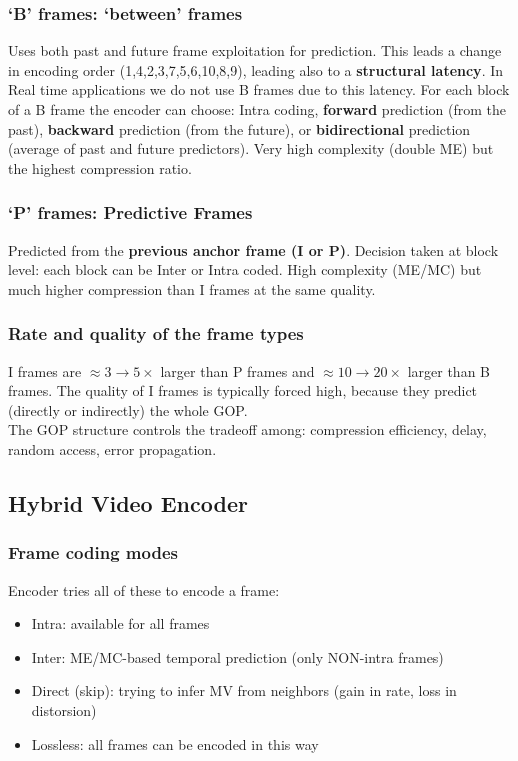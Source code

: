 \subsubsection{`B' frames: `between' frames}
Uses both past and future frame exploitation for prediction. This leads a change in encoding order (1,4,2,3,7,5,6,10,8,9), leading also to a \textbf{structural latency}.
In Real time applications we do not use B frames due to this latency.
For each block of a B frame the encoder can choose: Intra coding, \textbf{forward} prediction (from the past), \textbf{backward} prediction (from the future), or \textbf{bidirectional} prediction (average of past and future predictors). Very high complexity (double ME) but the highest compression ratio.
\subsubsection{`P' frames: Predictive Frames}
Predicted from the \textbf{previous anchor frame (I or P)}. Decision taken at block level: each block can be Inter or Intra coded. High complexity (ME/MC) but much higher compression than I frames at the same quality.
\subsubsection{Rate and quality of the frame types}
I frames are $\approx 3\to5\times$ larger than P frames and $\approx 10\to20\times$ larger than B frames. The quality of I frames is typically forced high, because they predict (directly or indirectly) the whole GOP.\\
The GOP structure controls the tradeoff among: compression efficiency, delay, random access, error propagation.
\subsection{Hybrid Video Encoder}
\subsubsection{Frame coding modes}
Encoder tries all of these to encode a frame:
\begin{itemize}
    \item Intra: available for all frames
    \item Inter: ME/MC-based temporal prediction (only NON-intra frames)
    \item Direct (skip): trying to infer MV from neighbors (gain in rate, loss in distorsion)
    \item Lossless: all frames can be encoded in this way
\end{itemize}
